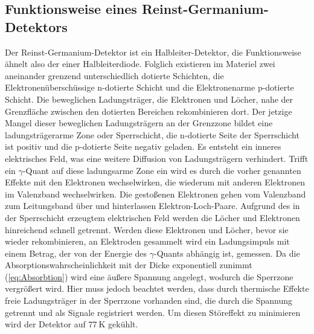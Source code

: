 \subsection{Funktionsweise eines Reinst-Germanium-Detektors}
Der Reinst-Germanium-Detektor ist ein Halbleiter-Detektor, die Funktionsweise ähnelt also der einer Halbleiterdiode.
Folglich existieren im Materiel zwei aneinander grenzend unterschiedlich dotierte Schichten, die Elektronenüberschüssige n-dotierte Schicht und die Elektronenarme p-dotierte Schicht.
Die beweglichen Ladungsträger, die Elektronen und Löcher, nahe der Grenzfläche zwischen den dotierten Bereichen rekombinieren dort.
Der jetzige Mangel dieser beweglichen Ladungsträgern an der Grenzzone bildet eine ladungsträgerarme Zone oder Sperrschicht, die n-dotierte Seite der Sperrschicht ist positiv und die p-dotierte Seite negativ geladen.
Es entsteht ein inneres elektrisches Feld, was eine weitere Diffusion von Ladungsträgern verhindert.
Trifft ein $\gamma$-Quant auf diese ladungsarme Zone ein wird es durch die vorher genannten Effekte mit den Elektronen wechselwirken, die wiederum mit anderen Elektronen im Valenzband wechselwirken.
Die gestoßenen Elektronen gehen vom Valenzband zum Leitungsband über und hinterlassen Elektron-Loch-Paare.
Aufgrund des in der Sperrschicht erzeugtem elektrischen Feld werden die Löcher und Elektronen hinreichend schnell getrennt.
Werden diese Elektronen und Löcher, bevor sie wieder rekombinieren, an Elektroden gesammelt wird ein Ladungsimpuls mit einem Betrag, der von der Energie des $\gamma$-Quants abhängig ist, gemessen.
Da die Absorptionswahrscheinlichkeit mit der Dicke exponentiell zunimmt (\ref{eq:Absorbtion}) wird eine äußere Spannung angelegt, wodurch die Sperrzone vergrößert wird.
Hier muss jedoch beachtet werden, dass durch thermische Effekte freie Ladungsträger in der Sperrzone vorhanden sind, die durch die Spannung getrennt und als Signale registriert werden.
Um diesen Störeffekt zu minimieren wird der Detektor auf $\SI{77}{\kelvin}$ gekühlt.

